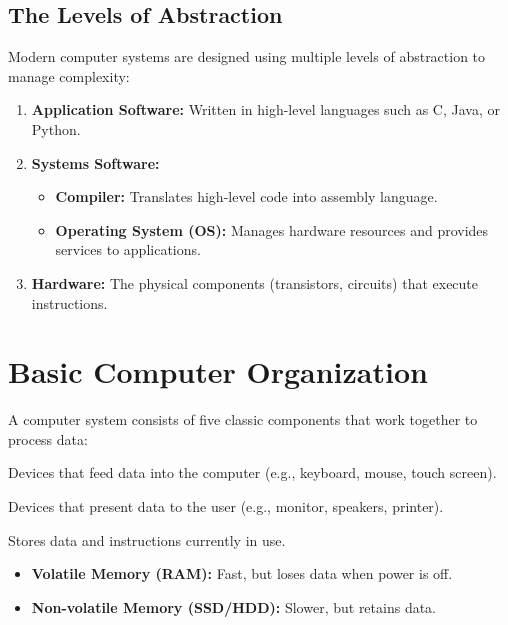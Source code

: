 \subsection{The Levels of Abstraction}

Modern computer systems are designed using multiple levels of abstraction to manage complexity:

\begin{enumerate}
    \item \textbf{Application Software:} Written in high-level languages such as C, Java, or Python.
    \item \textbf{Systems Software:}

    \begin{itemize}
        \item \textbf{Compiler:} Translates high-level code into assembly language.
        \item \textbf{Operating System (OS):} Manages hardware resources and provides services to applications.
    \end{itemize}

    \item \textbf{Hardware:} The physical components (transistors, circuits) that execute instructions.
\end{enumerate}

\section{Basic Computer Organization}

A computer system consists of five classic components that work together to process data:

\begin{vocabulary}[Input]
Devices that feed data into the computer (e.g., keyboard, mouse, touch screen).
\end{vocabulary}

\begin{vocabulary}[Output]
Devices that present data to the user (e.g., monitor, speakers, printer).
\end{vocabulary}

\begin{vocabulary}[Memory]
Stores data and instructions currently in use.

\begin{itemize}
    \item \textbf{Volatile Memory (RAM):} Fast, but loses data when power is off.
    \item \textbf{Non-volatile Memory (SSD/HDD):} Slower, but retains data.
\end{itemize}

\end{vocabulary}


